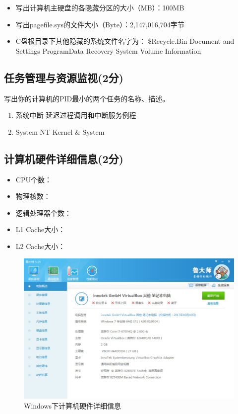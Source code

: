 \begin{itemize}
	\item 写出计算机主硬盘的各隐藏分区的大小（MB）：100MB
	\item 写出pagefile.sys的文件大小（Byte）：2,147,016,704字节
	\item C盘根目录下其他隐藏的系统文件名字为：
		\subitem \$Recycle.Bin
		\subitem Document and Settings
		\subitem ProgramData
		\subitem Recovery
		\subitem System Volume Information
\end{itemize}

\subsection{任务管理与资源监视(2分)}

写出你的计算机的PID最小的两个任务的名称、描述。

\begin{enumerate}
	\item 系统中断 延迟过程调用和中断服务例程
	\item System NT Kernel \& System
\end{enumerate}

\subsection{计算机硬件详细信息(2分)} 

\begin{itemize}
	\item CPU个数：
	\item 物理核数：
	\item 逻辑处理器个数：
	\item L1 Cache大小：
	\item L2 Cache大小：
\end{itemize}

\begin{figure}[H]
	\centering
	\includegraphics[width=0.7\linewidth]{figures/Win-HarewareInfo}
	\caption{Windows下计算机硬件详细信息}
	\label{fig:win-harewareinfo}
\end{figure}




